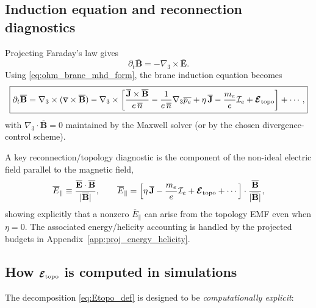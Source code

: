 \documentclass[11pt]{article}
\newcommand{\gradthree}{\nabla_3}
\begin{document}
\subsection{Induction equation and reconnection diagnostics}
\label{subsec:induction_topo}

Projecting Faraday's law gives
\begin{equation}
\partial_t\overline{\mathbf{B}} = -\gradthree\times \overline{\mathbf{E}}.
\end{equation}
Using \eqref{eq:ohm_brane_mhd_form}, the brane induction equation becomes
\begin{equation}
\boxed{
\partial_t\overline{\mathbf{B}}
=
\gradthree\times(\overline{\mathbf{v}}\times\overline{\mathbf{B}})
-\gradthree\times\left[
\frac{\overline{\mathbf{J}}\times\overline{\mathbf{B}}}{e\,\overline{n}}
-\frac{1}{e\,\overline{n}}\gradthree\overline{p_e}
+\eta\,\overline{\mathbf{J}}
-\frac{m_e}{e}\mathcal{I}_e
+\boldsymbol{\mathcal{E}}_{\rm topo}
\right]
+\cdots,
}
\label{eq:induction_with_topo}
\end{equation}
with \(\gradthree\cdot\overline{\mathbf{B}}=0\) maintained by the Maxwell solver (or by the chosen divergence-control scheme).

A key reconnection/topology diagnostic is the component of the non-ideal electric field parallel to the magnetic field,
\begin{equation}
\overline{E}_\parallel
\equiv
\frac{\overline{\mathbf{E}}\cdot\overline{\mathbf{B}}}{|\overline{\mathbf{B}}|},
\qquad
\overline{E}_\parallel
=
\left[
\eta\,\overline{\mathbf{J}}
-\frac{m_e}{e}\mathcal{I}_e
+\boldsymbol{\mathcal{E}}_{\rm topo}
+\cdots
\right]\cdot\frac{\overline{\mathbf{B}}}{|\overline{\mathbf{B}}|},
\label{eq:Eparallel_diag}
\end{equation}
showing explicitly that a nonzero \(\overline{E}_\parallel\) can arise from the topology EMF even when \(\eta=0\).
The associated energy/helicity accounting is handled by the projected budgets in Appendix~\ref{app:proj_energy_helicity}.

\subsection{How \texorpdfstring{$\boldsymbol{\mathcal{E}}_{\rm topo}$}{E topo} is computed in simulations}
\label{subsec:etopocompute}

The decomposition \eqref{eq:Etopo_def} is designed to be \emph{computationally explicit}:
\end{document}
